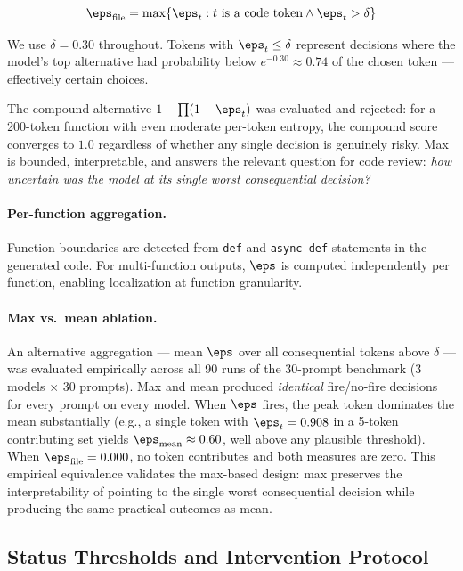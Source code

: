 \begin{equation}
  \eps_{\text{file}} = \max \{ \eps_t : t \text{ is a code token} \wedge \eps_t > \delta \}
  \label{eq:eps-file}
\end{equation}

We use $\delta = 0.30$ throughout. Tokens with $\eps_t \leq \delta$ represent
decisions where the model's top alternative had probability below $e^{-0.30} \approx 0.74$
of the chosen token --- effectively certain choices.

The compound alternative $1 - \prod(1 - \eps_t)$ was evaluated and rejected:
for a 200-token function with even moderate per-token entropy, the compound
score converges to $1.0$ regardless of whether any single decision is
genuinely risky. Max is bounded, interpretable, and answers the relevant question for
code review: \emph{how uncertain was the model at its single worst
consequential decision?}

\paragraph{Per-function aggregation.}
Function boundaries are detected from \texttt{def} and \texttt{async def}
statements in the generated code. For multi-function outputs, $\eps$ is
computed independently per function, enabling localization at function
granularity.

\paragraph{Max vs.\ mean ablation.}
An alternative aggregation --- mean $\eps$ over all consequential tokens above
$\delta$ --- was evaluated empirically across all 90 runs of the 30-prompt
benchmark (3 models $\times$ 30 prompts). Max and mean produced
\emph{identical} fire/no-fire decisions for every prompt on every model.
When $\eps$ fires, the peak token dominates the mean substantially (e.g., a
single token with $\eps_t = 0.908$ in a 5-token contributing set yields
$\eps_\text{mean} \approx 0.60$, well above any plausible threshold). When
$\eps_\text{file} = 0.000$, no token contributes and both measures are zero.
This empirical equivalence validates the max-based design: max preserves the
interpretability of pointing to the single worst consequential decision while
producing the same practical outcomes as mean.

\subsection{Status Thresholds and Intervention Protocol}
\label{sec:eps-thresholds}

